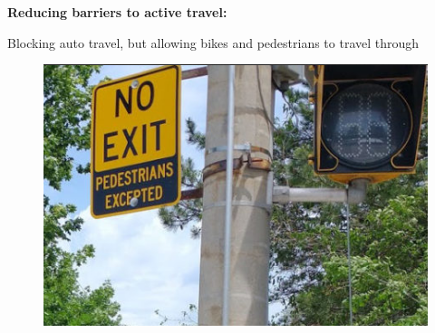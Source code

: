 \documentclass[aspectratio=169]{beamer}
\begin{document}
\begin{frame}
	
	
	
	
	
	

	
	\begin{columns}
		\begin{column}{0.5\textwidth}
			
				\textbf{Reducing barriers to active travel:} 
			
				Blocking auto travel, but allowing bikes and pedestrians to travel through
			
			
				\begin{figure}
					\centering
					\includegraphics[width=1\linewidth]{images/no_exit.png}
				\end{figure}
		\end{column}
		

\end{columns}
\end{frame}
\end{document}
